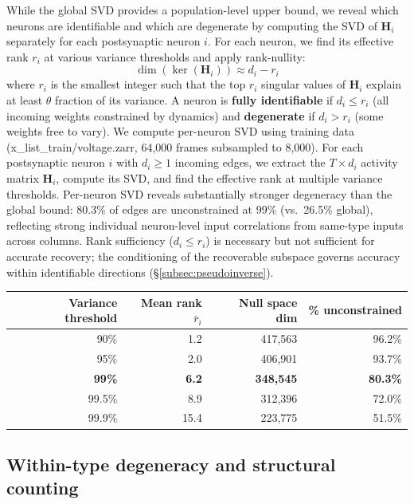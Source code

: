 \documentclass[11pt,a4paper]{article}
\begin{document}
While the global SVD provides a population-level upper bound, we reveal which neurons are identifiable and which are degenerate by computing the SVD of $\mathbf{H}_i$ separately for each postsynaptic neuron $i$. For each neuron, we find its effective rank $r_i$ at various variance thresholds and apply rank-nullity:
\begin{equation}
\dim(\ker(\mathbf{H}_i)) \approx d_i - r_i
\end{equation}
where $r_i$ is the smallest integer such that the top $r_i$ singular values of $\mathbf{H}_i$ explain at least $\theta$ fraction of its variance. A neuron is \textbf{fully identifiable} if $d_i \leq r_i$ (all incoming weights constrained by dynamics) and \textbf{degenerate} if $d_i > r_i$ (some weights free to vary). We compute per-neuron SVD using training data (x\_list\_train/voltage.zarr, 64,000 frames subsampled to 8,000). For each postsynaptic neuron $i$ with $d_i \geq 1$ incoming edges, we extract the $T \times d_i$ activity matrix $\mathbf{H}_i$, compute its SVD, and find the effective rank at multiple variance thresholds. Per-neuron SVD reveals substantially stronger degeneracy than the global bound: 80.3\% of edges are unconstrained at 99\% (vs.\ 26.5\% global), reflecting strong individual neuron-level input correlations from same-type inputs across columns. Rank sufficiency ($d_i \leq r_i$) is necessary but not sufficient for accurate recovery; the conditioning of the recoverable subspace governs accuracy within identifiable directions (\S\ref{subsec:pseudoinverse}).

\begin{center}
\begin{tabular}{rrrr}
\toprule
Variance threshold & Mean rank $\bar{r}_i$ & Null space dim & \% unconstrained \\
\midrule
90\%  & 1.2 & 417,563 & 96.2\% \\
95\%  & 2.0 & 406,901 & 93.7\% \\
\textbf{99\%}  & \textbf{6.2}  & \textbf{348,545} & \textbf{80.3\%} \\
99.5\% & 8.9 & 312,396 & 72.0\% \\
99.9\% & 15.4 & 223,775 & 51.5\% \\
\bottomrule
\end{tabular}
\end{center}


\subsection{Within-type degeneracy and structural counting}
\end{document}
